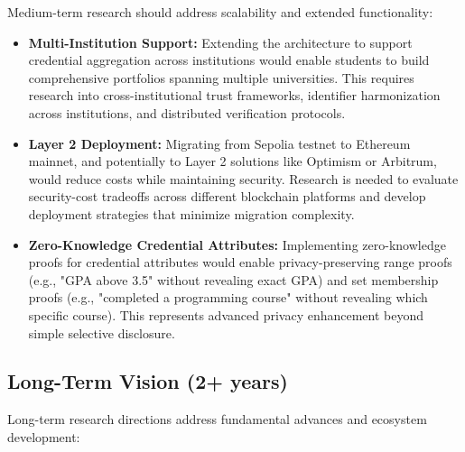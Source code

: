 Medium-term research should address scalability and extended functionality:

\begin{itemize}
    \item \textbf{Multi-Institution Support:} Extending the architecture to support credential aggregation across institutions would enable students to build comprehensive portfolios spanning multiple universities. This requires research into cross-institutional trust frameworks, identifier harmonization across institutions, and distributed verification protocols.

    \item \textbf{Layer 2 Deployment:} Migrating from Sepolia testnet to Ethereum mainnet, and potentially to Layer 2 solutions like Optimism or Arbitrum, would reduce costs while maintaining security. Research is needed to evaluate security-cost tradeoffs across different blockchain platforms and develop deployment strategies that minimize migration complexity.

    \item \textbf{Zero-Knowledge Credential Attributes:} Implementing zero-knowledge proofs for credential attributes would enable privacy-preserving range proofs (e.g., "GPA above 3.5" without revealing exact GPA) and set membership proofs (e.g., "completed a programming course" without revealing which specific course). This represents advanced privacy enhancement beyond simple selective disclosure.
\end{itemize}

\subsection{Long-Term Vision (2+ years)}
\label{subsec:longterm-future}

Long-term research directions address fundamental advances and ecosystem development:

